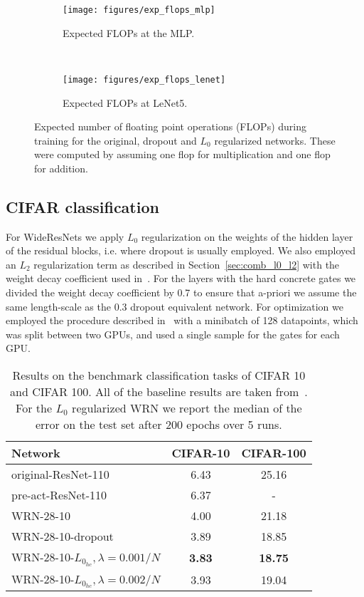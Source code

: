 \documentclass{article} %
\begin{document}
\begin{figure*}[htb!]
    \centering
    \begin{subfigure}[t]{0.5\textwidth}
        \centering
        \texttt{[image: figures/exp\_flops\_mlp]}
        \caption{Expected FLOPs at the MLP.}
    \end{subfigure}%
    ~ 
    \begin{subfigure}[t]{0.5\textwidth}
        \centering
        \texttt{[image: figures/exp\_flops\_lenet]}
        \caption{Expected FLOPs at LeNet5.}
    \end{subfigure}
    \caption{Expected number of floating point operations (FLOPs) during training for the original, dropout and $L_0$ regularized networks. These were computed by assuming one flop for multiplication and one flop for addition.}\label{fig:exp_flops_l0}
\end{figure*}


\subsection{CIFAR classification}
For WideResNets we apply $L_0$ regularization on the weights of the hidden layer of the residual blocks, i.e. where dropout is usually employed. We also employed an $L_2$ regularization term as described in Section~\ref{sec:comb_l0_l2} with the weight decay coefficient used in~\cite{zagoruyko2016wide}. For the layers with the hard concrete gates we divided the weight decay coefficient by 0.7 to ensure that a-priori we assume the same length-scale as the 0.3 dropout equivalent network. For optimization we employed the procedure described in~\cite{zagoruyko2016wide} with a minibatch of 128 datapoints, which was split between two GPUs, and used a single sample for the gates for each GPU.

\begin{table}[hbt!]
	\centering 
	\caption{Results on the benchmark classification tasks of CIFAR 10 and CIFAR 100. All of the baseline results are taken from~\cite{zagoruyko2016wide}. For the $L_0$ regularized WRN we report the median of the error on the test set after 200 epochs over 5 runs.}
	\label{tab:cifar10_results}
	\begin{tabular}{lcc}
		\toprule 
		Network & CIFAR-10& CIFAR-100\\
		\midrule
		original-ResNet-110~\citep{he2016deep} & 6.43 & 25.16\\
		pre-act-ResNet-110~\citep{he2016identity} & 6.37 & -\\
		\midrule 
		WRN-28-10~\citep{zagoruyko2016wide} &  4.00 & 21.18 \\
		WRN-28-10-dropout~\citep{zagoruyko2016wide} & 3.89 & 18.85 \\
		\midrule 
		WRN-28-10-$L_{0_{hc}}, \lambda=0.001/N$ & \textbf{3.83} & \textbf{18.75} \\ 
		WRN-28-10-$L_{0_{hc}}, \lambda=0.002/N$ & 3.93  & 19.04 \\  
		\bottomrule
	\end{tabular}
\end{table}
\end{document}
